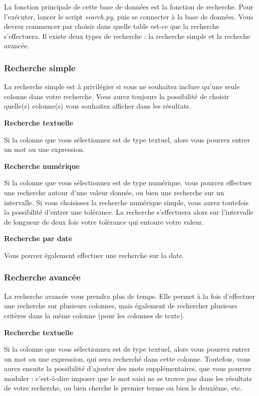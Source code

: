 \documentclass[12pt,a4paper]{article}
\begin{document}
    La fonction principale de cette base de données est la fonction de recherche.
    Pour l'exécuter, lancer le script \emph{search.py}, puis se connecter à la base de données.
    Vous devrez commencer par choisir dans quelle table est-ce que la recherche s'effectuera.
    Il existe deux types de recherche : la recherche simple et la recheche avancée.

    \subsubsection{Recherche simple}
        La recherche simple est à privilégier si vous ne souhaitez inclure qu'une seule colonne dans votre recherche.
        Vous aurez toujours la possibilité de choisir quelle(s) colonne(s) vous souhaitez afficher dans les résultats.


        \medskip
        \textbf{Recherche textuelle}

        Si la colonne que vous sélectionnez est de type textuel, alors vous pourrez entrer un mot ou une expression.
        
        \medskip
        \textbf{Recherche numérique}
        
        Si la colonne que vous sélectionnez est de type numérique, vous pourrez effectuer une recherche autour d'une valeur donnée,
        ou bien une recherche sur un intervalle. Si vous choisissez la recherche numérique simple, vous aurez toutefois
        la possibilité d'entrer une tolérance. La recherche s'effectuera alors sur l'intervalle de longueur de deux fois votre tolérance
        qui entoure votre valeur.

        \medskip
        \textbf{Recherche par date}
        
        Vous pouvez également effectuer une recherche sur la date.

    \subsubsection{Recherche avancée}
        La recherche avancée vous prendra plus de temps. Elle permet à la fois d'effectuer une recherche sur plusieurs colonnes,
        mais également de rechercher plusieurs critères dans la même colonne (pour les colonnes de texte).

        \medskip
        \textbf{Recherche textuelle}

        Si la colonne que vous sélectionnez est de type textuel, alors vous pourrez entrer un mot ou une expression, qui sera recherché
        dans cette colonne. Toutefois, vous aurez ensuite la possibilité d'ajouter des mots supplémentaires, que vous pourrez moduler :
        c'est-à-dire imposer que le mot saisi ne se trouve pas dans les résultats de votre recherche, ou bien cherche le premier terme
        ou bien le deuxième, etc.
        
\end{document}
